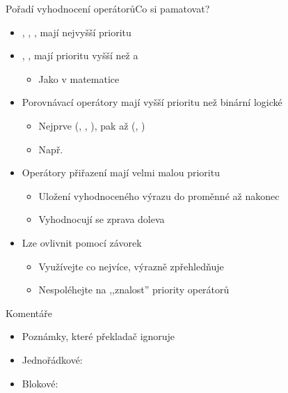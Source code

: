 \begin{frame}[fragile]{Pořadí vyhodnocení operátorů}{Co si pamatovat?}

  \begin{itemize}
    \item \code{++}, \code{\--}, \code{()}, \code{[]} mají nejvyšší prioritu

    \pause

    \item \code{*}, \code{/}, \code{\%} mají prioritu vyšší než \code{+} a
      \code{\-}
    \begin{itemize}
      \item Jako v matematice
    \end{itemize}

    \pause

    \item Porovnávací operátory mají vyšší prioritu než binární logické
    \begin{itemize}
      \item Nejprve (\code{==}, \code{!=}, \code{<}), pak až (\code{\&\&},
        \code{||})
      \item Např.\ 
    \end{itemize}

    \pause

    \item Operátory přiřazení mají velmi malou prioritu
    \begin{itemize}
      \item Uložení vyhodnoceného výrazu do proměnné až nakonec
      \item Vyhodnocují se zprava doleva
    \end{itemize}

    \pause

    \item Lze ovlivnit pomocí závorek \code{()}
    \begin{itemize}
      \item Využívejte co nejvíce, výrazně zpřehledňuje
      \item Nespoléhejte na ,,znalost'' priority operátorů
    \end{itemize}

  \end{itemize}

\end{frame}

\begin{frame}{Komentáře}

  \begin{itemize}
    \item Poznámky, které překladač ignoruje

    \pause

    \item Jednořádkové: 
    \item Blokové: 
  \end{itemize}

\end{frame}

